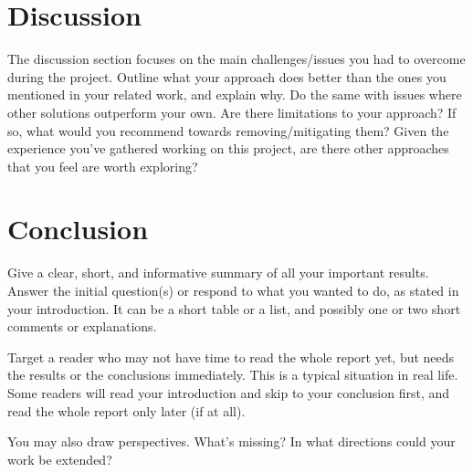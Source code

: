 \documentclass{scrartcl}
\begin{document}
\section{Discussion}
The discussion section focuses on the main challenges/issues you had to overcome during the project. Outline what your approach does better than the ones you mentioned in your related work, and explain why. Do the same with issues where other solutions  outperform your own. Are there limitations to your approach? If so, what would you recommend towards removing/mitigating them? Given the experience you've gathered working on this project, are there other approaches that you feel are worth exploring?

\section{Conclusion}

Give a clear, short, and informative summary of all your important results. Answer the initial question(s) or respond to what you wanted to do, as stated in your introduction. It can be a short table or a list, and possibly one or two short comments or explanations.

Target a reader who may not have time to read the whole report yet, but needs the results or the conclusions immediately. This is a typical situation in real life. Some readers will read your introduction and skip to your conclusion first, and read the whole report only later (if at all).

You may also draw perspectives. What's missing? In what directions could your work be extended?

\newpage
\singlespacing




\end{document}
